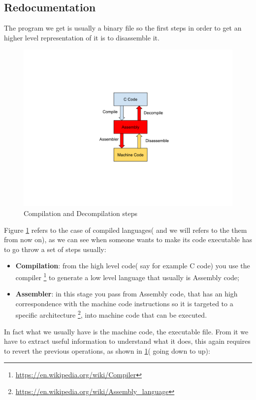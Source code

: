 \documentclass{article}
\begin{document}
\subsection{Redocumentation}
The program we get is usually a binary file so the first steps in order to get an higher level representation of it is to disassemble it.
\begin{figure}[htp]
    \centering
    \includegraphics[width=1\textwidth]{images/redocumentation.pdf}
    \caption{Compilation and Decompilation steps \citep{SlideReverse}}
    \label{fig:redocumentation}
\end{figure}
Figure \ref{fig:redocumentation} refers to the case of compiled languages( and we will refers to the them from now on), as we can see when someone wants to make its code executable has to go throw a set of steps usually:
\begin{itemize}
    \item \textbf{Compilation}: from the high level code( say for example C code) you use the compiler \footnote{\url{https://en.wikipedia.org/wiki/Compiler}} to generate a low level language that usually is Assembly code;
    \item \textbf{Assembler}: in this stage you pass from Assembly code, that has an high correspondence with the machine code instructions so it is targeted to a specific architecture \footnote{\url{https://en.wikipedia.org/wiki/Assembly_language}}, into machine code that can be executed.
\end{itemize}
In fact what we usually have is the machine code, the executable file. From it we have to extract useful information to understand what it does, this again requires to revert the previous operations, as shown in \ref{fig:redocumentation}( going down to up):
\end{document}
